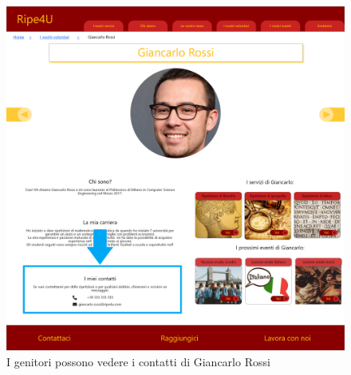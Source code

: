     \begin{figure}[H]
        \centering
        \includegraphics[scale=0.25]{resources/images/scenario1-5.png}
        \caption{I genitori possono vedere i contatti di Giancarlo Rossi}
    \end{figure}

    \newpage
